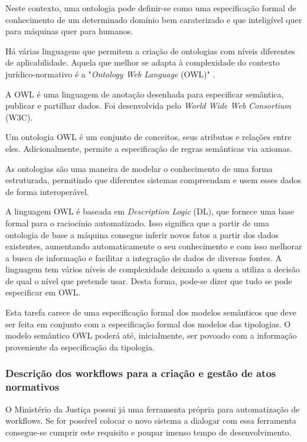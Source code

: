 Neste contexto, uma ontologia pode definir-se como uma especificação formal de conhecimento de um determinado domínio bem 
caraterizado e que inteligível quer para máquinas quer para humanos.

Há várias linguagens que permitem a criação de ontologias com níveis diferentes de aplicabilidade.
Aquela que melhor se adapta à complexidade do contexto jurídico-normativo é a "\emph{Ontology Web Language} (OWL)" 
\cite{owl,owl2}.

A OWL é uma linguagem de anotação desenhada para especificar semântica, publicar e partilhar dados. 
Foi desenvolvida pelo \emph{World Wide Web Consortium} (W3C).

Um ontologia OWL é um conjunto de conceitos, seus atributos e relações entre eles. 
Adicionalmente, permite a especificação de regras semânticas via axiomas.

As ontologias são uma maneira de modelar o conhecimento de uma forma estruturada, permitindo que diferentes sistemas 
compreendam e usem esses dados de forma interoperável.

A linguagem OWL é baseada em \emph{Description Logic} (DL), que fornece uma base formal para o raciocínio automatizado. 
Isso significa que a partir de uma ontologia de base a máquina consegue inferir novos fatos a partir dos dados existentes, 
aumentando automaticamente o seu conhecimento e com isso 
melhorar a busca de informação e facilitar a integração de dados de diversas fontes.
A linguagem tem vários níveis de complexidade deixando a quem a utiliza a decisão de qual o nível que pretende usar. 
Desta forma, pode-se dizer que tudo se pode especificar em OWL.

Esta tarefa carece de uma especificação formal dos modelos semânticos que deve ser feita em conjunto com a 
especificação formal dos modelos das tipologias.
O modelo semântico OWL poderá até, inicialmente, ser povoado com a informação proveniente da especificação 
da tipologia.

\subsubsection{Descrição dos workflows para a criação e gestão de atos normativos}

O Ministério da Justiça possui já uma ferramenta própria para automatização de workflows. 
Se for possível colocar o novo sistema a dialogar com essa ferramenta consegue-se cumprir este requisito e 
poupar imenso tempo de desenvolvimento.

